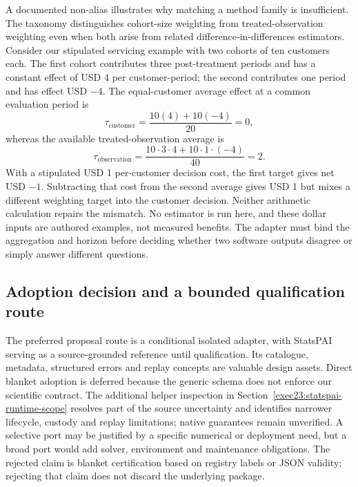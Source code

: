 A documented non-alias illustrates why matching a method family is insufficient.
The taxonomy distinguishes cohort-size weighting from treated-observation
weighting even when both arise from related difference-in-differences estimators.
Consider our stipulated servicing example with two cohorts of ten customers
each. The first cohort contributes three post-treatment periods and has a
constant effect of USD 4 per customer-period; the second contributes one period
and has effect USD $-4$. The equal-customer average effect at a common evaluation
period is
\[
 \tau_{\mathrm{customer}}=\frac{10(4)+10(-4)}{20}=0,
\]
whereas the available treated-observation average is
\[
 \tau_{\mathrm{observation}}=\frac{10\cdot3\cdot4+10\cdot1\cdot(-4)}{40}=2.
\]
With a stipulated USD 1 per-customer decision cost, the first target gives
net USD $-1$. Subtracting that cost from the second average gives USD 1 but
mixes a different weighting target into the customer decision. Neither
arithmetic calculation repairs the mismatch. No estimator is run here, and
these dollar inputs are authored examples, not measured benefits. The adapter
must bind the aggregation and horizon before deciding whether two software
outputs disagree or simply answer different questions.
\citep{exec23_statspai_contract,exec23_statspai_contract_reference}

\subsection{Adoption decision and a bounded qualification route}
\label{exec23:statspai-contract-decision}
The preferred proposal route is a conditional isolated adapter, with StatsPAI
serving as a source-grounded reference until qualification. Its catalogue,
metadata, structured errors and replay concepts are valuable design assets.
Direct blanket adoption is deferred because the generic schema does not enforce
our scientific contract. The additional helper inspection in Section~\ref{exec23:statspai-runtime-scope} resolves part of the source uncertainty and identifies narrower lifecycle, custody and replay limitations; native guarantees remain unverified.
A selective port may be justified by a specific numerical or deployment need,
but a broad port would add solver, environment and maintenance obligations.
The rejected claim is blanket certification based on registry labels or JSON
validity; rejecting that claim does not discard the underlying package.
\citep{exec23_statspai_contract}


